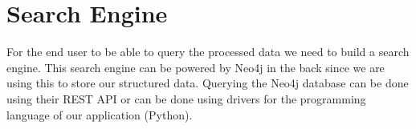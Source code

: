 \section{Search Engine}

For the end user to be able to query the processed data we need to build a search engine. This search engine can be powered by Neo4j in the back since we are using this to store our structured data.
Querying the Neo4j database can be done using their REST API or can be done using drivers for the programming language of our application (Python).
